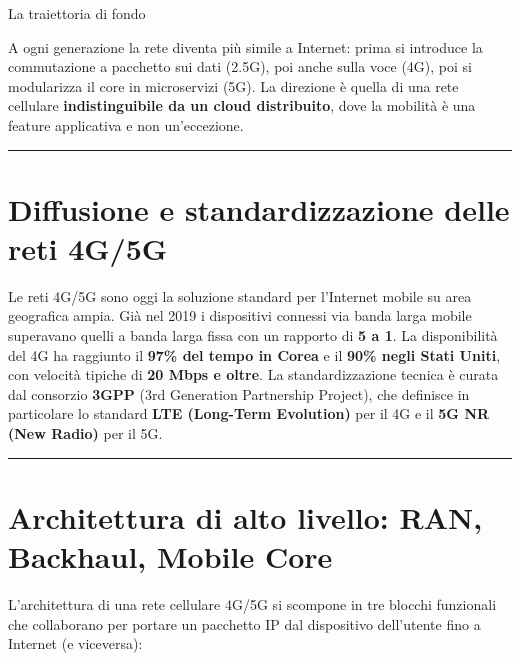 \documentclass[
  italian,
  openany]{book}
\begin{document}
\begin{callouttip}{La traiettoria di fondo}

A ogni generazione la rete diventa più simile a Internet: prima si
introduce la commutazione a pacchetto sui dati (2.5G), poi anche sulla
voce (4G), poi si modularizza il core in microservizi (5G). La direzione
è quella di una rete cellulare \textbf{indistinguibile da un cloud
distribuito}, dove la mobilità è una feature applicativa e non
un'eccezione.

\end{callouttip}

\begin{center}\rule{0.5\linewidth}{0.5pt}\end{center}

\section{Diffusione e standardizzazione delle reti
4G/5G}\label{diffusione-e-standardizzazione-delle-reti-4g5g}

Le reti 4G/5G sono oggi la soluzione standard per l'Internet mobile su
area geografica ampia. Già nel 2019 i dispositivi connessi via banda
larga mobile superavano quelli a banda larga fissa con un rapporto di
\textbf{5 a 1}. La disponibilità del 4G ha raggiunto il \textbf{97\% del
tempo in Corea} e il \textbf{90\% negli Stati Uniti}, con velocità
tipiche di \textbf{20 Mbps e oltre}. La standardizzazione tecnica è
curata dal consorzio \textbf{3GPP} (3rd Generation Partnership Project),
che definisce in particolare lo standard \textbf{LTE (Long-Term
Evolution)} per il 4G e il \textbf{5G NR (New Radio)} per il 5G.

\begin{center}\rule{0.5\linewidth}{0.5pt}\end{center}

\section{Architettura di alto livello: RAN, Backhaul, Mobile
Core}\label{architettura-di-alto-livello-ran-backhaul-mobile-core}

L'architettura di una rete cellulare 4G/5G si scompone in tre blocchi
funzionali che collaborano per portare un pacchetto IP dal dispositivo
dell'utente fino a Internet (e viceversa):
\end{document}
